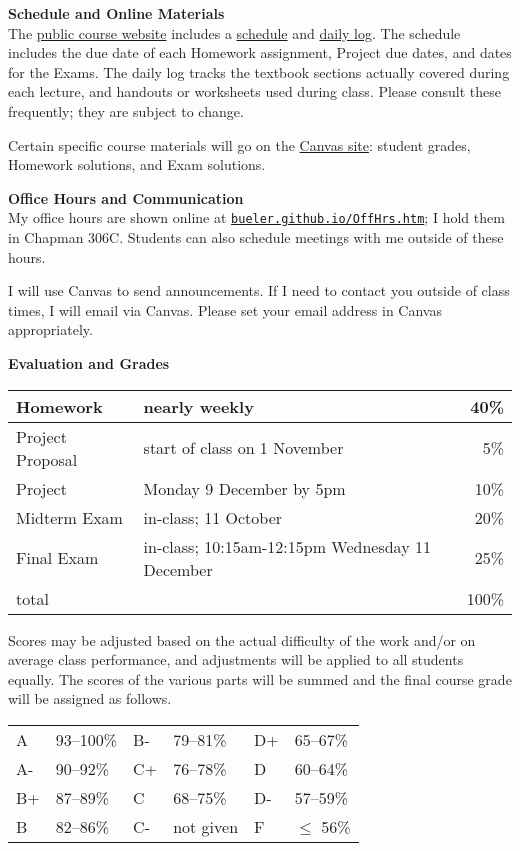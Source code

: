 \documentclass[12pt]{article}
\renewcommand{\emph}[1]{\textsf{\textbf{#1}}}
\newcommand{\localhead}[1]{\par\smallskip\textbf{#1} \smallskip\nobreak\\}%
\def\heading#1{\localhead{\large\emph{#1}}}
\begin{document}
\heading{Schedule and Online Materials}
The \href{https://bueler.github.io/numerical/}{public course website} includes a \href{https://bueler.github.io/numerical/assets/general/F24/schedule.pdf}{schedule} and \href{https://bueler.github.io/numerical/daily.html}{daily log}.  The schedule includes the due date of each Homework assignment, Project due dates, and dates for the Exams.  The daily log tracks the textbook sections actually covered during each lecture, and handouts or worksheets used during class.  Please consult these frequently; they are subject to change.

Certain specific course materials will go on the \href{https://canvas.alaska.edu/courses/21626}{Canvas site}: student grades, Homework solutions, and Exam solutions.

\heading{Office Hours and Communication}
My office hours are shown online at \href{http://bueler.github.io/OffHrs.htm}{\texttt{bueler.github.io/OffHrs.htm}}; I hold them in Chapman 306C.  Students can also schedule meetings with me outside of these hours.

I will use Canvas to send announcements.  If I need to contact you outside of class times, I will email via Canvas.  Please set your email address in Canvas appropriately.

\heading{Evaluation and Grades}
\vskip -10pt

\begin{tabular}{|l|l|r|}
\hline
Homework         & nearly weekly & 40\% \\
\hline
Project Proposal & start of class on 1 November & 5\% \\
\hline
Project          & {\color{red} Monday 9 December by 5pm} & 10\% \\
\hline
Midterm Exam     & in-class; 11 October & 20\%  \\
\hline
Final Exam       & in-class; 10:15am-12:15pm Wednesday 11 December & 25\% \\
\hline
total            & & 100\% \\
\hline
\end{tabular}

Scores may be adjusted based on the actual difficulty of the work and/or on average class performance, and adjustments will be applied to all students equally.  The scores of the various parts will be summed and the final course grade will be assigned as follows.

\begin{tabular}{llllll}
A  & 93--100\% & B- & 79--81\%  & D+ & 65--67\%  \\
A- & 90--92\%  & C+ & 76--78\%  & D  & 60--64\%  \\
B+ & 87--89\%  & C  & 68--75\%  & D- & 57--59\%  \\
B  & 82--86\%  & C- & not given & F  & $\le$ 56\%
\end{tabular}
\end{document}
